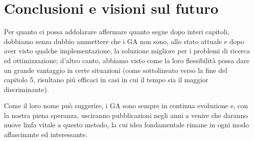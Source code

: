 \section{Conclusioni e visioni sul futuro}
Per quanto ci possa addolarare affermare quanto segue dopo interi capitoli, dobbiamo senza dubbio ammettere che i GA non sono, allo stato attuale e dopo aver visto qualche implementazione, la soluzione migliore per i problemi di ricerca ed ottimizzazione; d'altro canto, abbiamo visto come la loro flessibilit\`a possa dare un grande vantaggio in certe situazioni (come sottolineato verso la fine del capitolo 5, risultano pi\`u efficaci in casi in cui il tempo sia il maggior discriminante).
\vspace{3mm}

Come il loro nome pu\`o suggerire, i GA sono sempre in continua evoluzione e, con la nostra piena speranza, usciranno pubblicazioni negli anni a venire che daranno nuove linfa vitale a questo metodo, la cui idea fondamentale rimane in ogni modo affascinante ed interessante.
\newpage